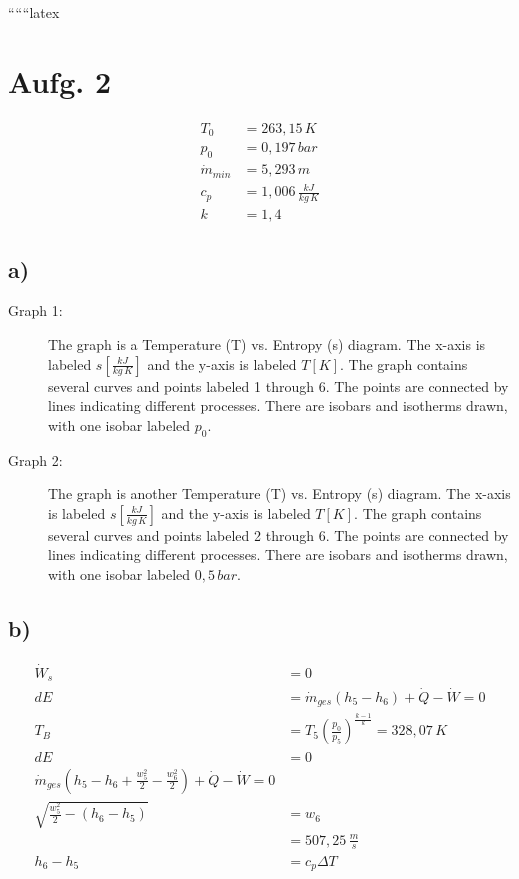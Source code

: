 
``````latex


\section*{Aufg. 2}

\begin{align*}
T_0 &= 263{,}15\,K \\
p_0 &= 0{,}197\,bar \\
\dot{m}_{min} &= 5{,}293\,m \\
c_p &= 1{,}006\,\frac{kJ}{kg\,K} \\
k &= 1{,}4
\end{align*}

\subsection*{a)}

\begin{description}
    \item[Graph 1:] 
    The graph is a Temperature (T) vs. Entropy (s) diagram. The x-axis is labeled $s \left[\frac{kJ}{kg\,K}\right]$ and the y-axis is labeled $T \left[K\right]$. The graph contains several curves and points labeled 1 through 6. The points are connected by lines indicating different processes. There are isobars and isotherms drawn, with one isobar labeled $p_0$.
    
    \item[Graph 2:] 
    The graph is another Temperature (T) vs. Entropy (s) diagram. The x-axis is labeled $s \left[\frac{kJ}{kg\,K}\right]$ and the y-axis is labeled $T \left[K\right]$. The graph contains several curves and points labeled 2 through 6. The points are connected by lines indicating different processes. There are isobars and isotherms drawn, with one isobar labeled $0{,}5\,bar$.
\end{description}

\subsection*{b)}

\begin{align*}
\dot{W}_s &= 0 \\
dE &= \dot{m}_{ges}(h_5 - h_6) + \dot{Q} - \dot{W} = 0 \\
T_B &= T_5 \left(\frac{p_0}{p_5}\right)^{\frac{k-1}{k}} = 328{,}07\,K \\
dE &= 0 \\
\dot{m}_{ges}(h_5 - h_6 + \frac{w_5^2}{2} - \frac{w_6^2}{2}) + \dot{Q} - \dot{W} = 0 \\
\sqrt{\frac{w_5^2}{2} - (h_6 - h_5)} &= w_6 \\
&= 507{,}25\,\frac{m}{s} \\
h_6 - h_5 &= c_p \Delta T
\end{align*}

